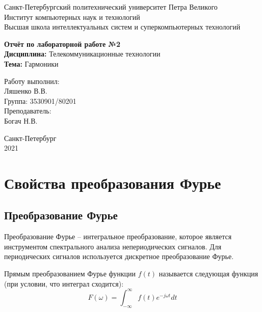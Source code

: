 \documentclass[a4paper,12pt]{report}
\begin{document}
 

\begin{titlepage}
\newpage
	\begin{center}
		\large Санкт-Петербургский политехнический университет Петра Великого\\
		Институт компьютерных наук и технологий\\
		Высшая школа интеллектуальных систем и суперкомпьютерных технологий\\
	\end{center}
\vspace{7cm}

\begin{center}
		\large \textbf{Отчёт по лабораторной работе №2} \\
		\textbf{Дисциплина:} Телекоммуникационные технологии\\
		\textbf{Тема:} Гармоники
\end{center}
\vspace{4cm}
	
\begin{flushright}
		\large Работу выполнил:\\ Ляшенко В.В.\\
		Группа: 3530901/80201\\
		Преподаватель:\\ Богач Н.В.
\end{flushright}

\vspace{\fill}
\begin{center}
	\large Санкт-Петербург\\ 2021
	\end{center}
\end{titlepage}

\tableofcontents
\listoffigures
\lstlistoflistings

\chapter{Свойства преобразования Фурье}
\section{Преобразование Фурье}
    Преобразование Фурье – интегральное преобразование, которое является инструментом спектрального анализа непериодических сигналов. Для периодических сигналов используется дискретное преобразование Фурье.
    
    Прямым преобразованием Фурье функции $f(t)$ называется следующая функция (при условии, что интеграл сходится):
\begin{equation}
       F(\omega) = \int_{-\infty}^{\infty} f(t) e^{-j \omega t} dt
\end{equation}
    
\end{document}
